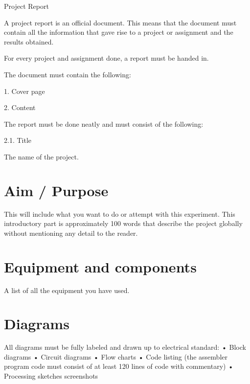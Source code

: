 \documentclass[a4,12pt]{article}
\begin{document}




Project Report

A project report is an official document. This means that the document must contain all the information that gave rise to a project or assignment and the results obtained.

For every project and assignment done, a report must be handed in.

The document must contain the following:


    1. Cover page


    2. Content

The report must be done neatly and must consist of the following:

        2.1. Title

The name of the project.

\section{Aim / Purpose}        

This will include what you want to do or attempt with this experiment. This introductory part is approximately 100 words that describe the project globally without mentioning any detail to the reader.


\section{Equipment and components} 

A list of all the equipment you have used.

\section{Diagrams}        

All diagrams must be fully labeled and drawn up to electrical standard:
    • Block diagrams
    • Circuit diagrams
    • Flow charts
    • Code listing (the assembler program code must consist of at least 120 lines of code with commentary)
    • Processing sketches screenshots 
\end{document}
